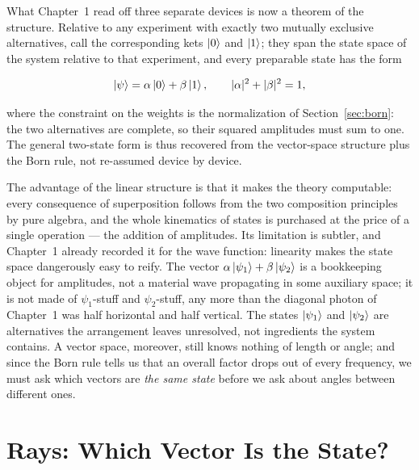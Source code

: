 What Chapter~1 read off three separate devices is now a theorem of the structure. Relative to any experiment with exactly two mutually exclusive alternatives, call the corresponding kets $\ket{0}$ and $\ket{1}$; they span the state space of the system relative to that experiment, and every preparable state has the form
\begin{linenomath}
\begin{equation}
    \ket{\psi}=\alpha\ket{0}+\beta\ket{1},
    \qquad
    |\alpha|^2+|\beta|^2=1,
\end{equation}
\end{linenomath}
where the constraint on the weights is the normalization of Section~\ref{sec:born}: the two alternatives are complete, so their squared amplitudes must sum to one. The general two-state form is thus recovered from the vector-space structure plus the Born rule, not re-assumed device by device.

The advantage of the linear structure is that it makes the theory computable: every consequence of superposition follows from the two composition principles by pure algebra, and the whole kinematics of states is purchased at the price of a single operation --- the addition of amplitudes. Its limitation is subtler, and Chapter~1 already recorded it for the wave function: linearity makes the state space dangerously easy to reify. The vector $\alpha\ket{\psi_1}+\beta\ket{\psi_2}$ is a bookkeeping object for amplitudes, not a material wave propagating in some auxiliary space; it is not made of $\psi_1$-stuff and $\psi_2$-stuff, any more than the diagonal photon of Chapter~1 was half horizontal and half vertical. The states $\ket{\psi_1}$ and $\ket{\psi_2}$ are alternatives the arrangement leaves unresolved, not ingredients the system contains. A vector space, moreover, still knows nothing of length or angle; and since the Born rule tells us that an overall factor drops out of every frequency, we must ask which vectors are \emph{the same state} before we ask about angles between different ones.

\section{Rays: Which Vector Is the State?}
\label{sec:rays}

